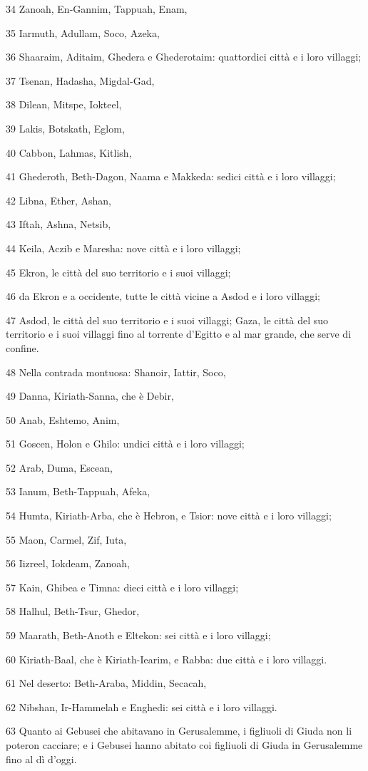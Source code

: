 \par 34 Zanoah, En-Gannim, Tappuah, Enam,
\par 35 Iarmuth, Adullam, Soco, Azeka,
\par 36 Shaaraim, Aditaim, Ghedera e Ghederotaim: quattordici città e i loro villaggi;
\par 37 Tsenan, Hadasha, Migdal-Gad,
\par 38 Dilean, Mitspe, Iokteel,
\par 39 Lakis, Botskath, Eglom,
\par 40 Cabbon, Lahmas, Kitlish,
\par 41 Ghederoth, Beth-Dagon, Naama e Makkeda: sedici città e i loro villaggi;
\par 42 Libna, Ether, Ashan,
\par 43 Iftah, Ashna, Netsib,
\par 44 Keila, Aczib e Maresha: nove città e i loro villaggi;
\par 45 Ekron, le città del suo territorio e i suoi villaggi;
\par 46 da Ekron e a occidente, tutte le città vicine a Asdod e i loro villaggi;
\par 47 Asdod, le città del suo territorio e i suoi villaggi; Gaza, le città del suo territorio e i suoi villaggi fino al torrente d'Egitto e al mar grande, che serve di confine.
\par 48 Nella contrada montuosa: Shanoir, Iattir, Soco,
\par 49 Danna, Kiriath-Sanna, che è Debir,
\par 50 Anab, Eshtemo, Anim,
\par 51 Goscen, Holon e Ghilo: undici città e i loro villaggi;
\par 52 Arab, Duma, Escean,
\par 53 Ianum, Beth-Tappuah, Afeka,
\par 54 Humta, Kiriath-Arba, che è Hebron, e Tsior: nove città e i loro villaggi;
\par 55 Maon, Carmel, Zif, Iuta,
\par 56 Iizreel, Iokdeam, Zanoah,
\par 57 Kain, Ghibea e Timna: dieci città e i loro villaggi;
\par 58 Halhul, Beth-Tsur, Ghedor,
\par 59 Maarath, Beth-Anoth e Eltekon: sei città e i loro villaggi;
\par 60 Kiriath-Baal, che è Kiriath-Iearim, e Rabba: due città e i loro villaggi.
\par 61 Nel deserto: Beth-Araba, Middin, Secacah,
\par 62 Nibshan, Ir-Hammelah e Enghedi: sei città e i loro villaggi.
\par 63 Quanto ai Gebusei che abitavano in Gerusalemme, i figliuoli di Giuda non li poteron cacciare; e i Gebusei hanno abitato coi figliuoli di Giuda in Gerusalemme fino al dì d'oggi.


